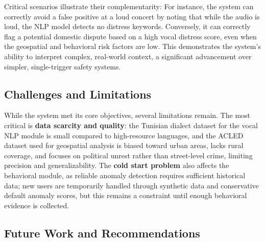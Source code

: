 \documentclass[12pt,a4paper,oneside,english]{book}
\begin{document}
Critical scenarios illustrate their complementarity: For instance, the system can correctly avoid a false positive at a loud concert by noting that while the audio is loud, the NLP model detects 
no distress keywords. Conversely, it can correctly flag a potential domestic dispute based on a high vocal distress score, even when the geospatial and behavioral risk factors are low. 
This demonstrates the system's ability to interpret complex, real-world context, a significant advancement over simpler, single-trigger safety systems.

    \subsection{Challenges and Limitations}
    \label{subsec:challenges}
While the system met its core objectives, several limitations remain. The most critical is \textbf{data scarcity and quality}: the Tunisian dialect dataset for the vocal NLP module is small compared to high-resource languages, and the ACLED dataset used for geospatial analysis is biased toward urban areas, lacks rural coverage, and focuses on political unrest rather than street-level crime, limiting precision and generalizability. The \textbf{cold start problem} also affects the behavioral module, as reliable anomaly detection requires sufficient historical data; new users are temporarily handled through synthetic data and conservative default anomaly scores, but this remains a constraint until enough behavioral evidence is collected.


    \subsection{Future Work and Recommendations}
    \label{subsec:future_work}
\end{document}
